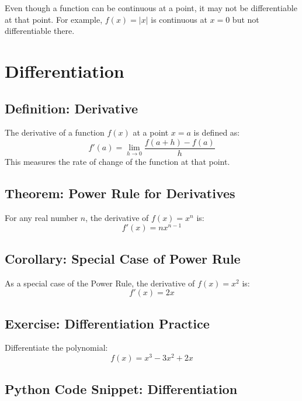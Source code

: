 \begin{obs}
Even though a function can be continuous at a point, it may not be differentiable at that point. For example, $f(x) = |x|$ is continuous at $x = 0$ but not differentiable there.
\end{obs}


\section{Differentiation}

\subsection{Definition: Derivative}
\begin{defi}
The derivative of a function $f(x)$ at a point $x = a$ is defined as:
\[
f'(a) = \lim_{h \to 0} \frac{f(a+h) - f(a)}{h}
\]
This measures the rate of change of the function at that point.
\end{defi}

\subsection{Theorem: Power Rule for Derivatives}
\begin{theorem}
For any real number $n$, the derivative of $f(x) = x^n$ is:
\[
f'(x) = nx^{n-1}
\]
\end{theorem}

\subsection{Corollary: Special Case of Power Rule}
\begin{cor}
As a special case of the Power Rule, the derivative of $f(x) = x^2$ is:
\[
f'(x) = 2x
\]
\end{cor}

\subsection{Exercise: Differentiation Practice}
\begin{exercise}
Differentiate the polynomial:
\[
f(x) = x^3 - 3x^2 + 2x
\]
\end{exercise}

\subsection{Python Code Snippet: Differentiation}
\begin{codesnippet}
\end{codesnippet}

